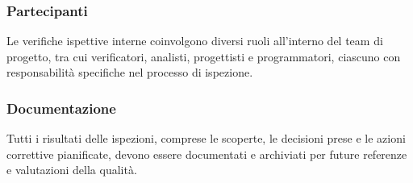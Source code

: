 \subsubsection{Partecipanti}
Le verifiche ispettive interne coinvolgono diversi ruoli all'interno del team
di progetto, tra cui verificatori, analisti, progettisti e programmatori,
ciascuno con responsabilità specifiche nel processo di ispezione.

\subsubsection{Documentazione}
Tutti i risultati delle ispezioni, comprese le scoperte, le decisioni prese e
le azioni correttive pianificate, devono essere documentati e archiviati per
future referenze e valutazioni della qualità.

